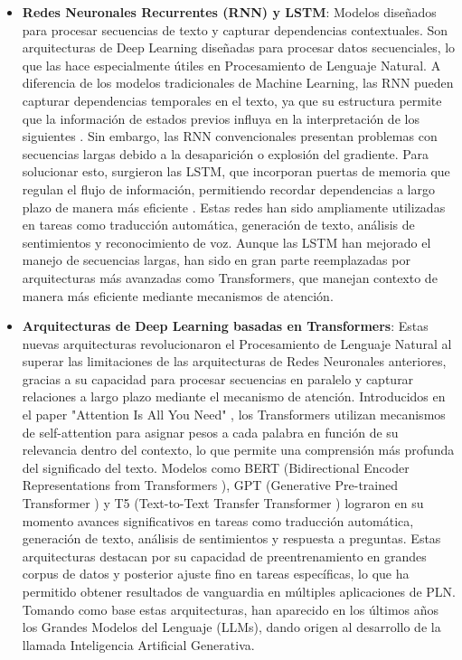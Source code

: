 \begin{itemize}
\begin{itemize}
            \item \textbf{Redes Neuronales Recurrentes (RNN) y LSTM}: Modelos diseñados para procesar secuencias de texto y capturar dependencias contextuales.
            Son arquitecturas de Deep Learning diseñadas para procesar datos secuenciales, lo que las hace especialmente útiles en Procesamiento de Lenguaje Natural. 
            A diferencia de los modelos tradicionales de Machine Learning, las RNN pueden capturar dependencias temporales en el texto, ya que su estructura permite que la información de estados previos influya en la interpretación de los siguientes \cite{schmidt2019recurrentneuralnetworksrnns}. 
            Sin embargo, las RNN convencionales presentan problemas con secuencias largas debido a la desaparición o explosión del gradiente. 
            Para solucionar esto, surgieron las LSTM, que incorporan puertas de memoria que regulan el flujo de información, permitiendo recordar dependencias a largo plazo de manera más eficiente \cite{staudemeyer2019understandinglstmtutorial}. 
            Estas redes han sido ampliamente utilizadas en tareas como traducción automática, generación de texto, análisis de sentimientos y reconocimiento de voz. 
            Aunque las LSTM han mejorado el manejo de secuencias largas, han sido en gran parte reemplazadas por arquitecturas más avanzadas como Transformers, que manejan contexto de manera más eficiente mediante mecanismos de atención.
            
            \item \textbf{Arquitecturas de Deep Learning basadas en Transformers}: Estas nuevas arquitecturas revolucionaron el Procesamiento de Lenguaje Natural al superar las limitaciones de las arquitecturas de Redes Neuronales anteriores, gracias a su capacidad para procesar secuencias en paralelo y capturar relaciones a largo plazo mediante el mecanismo de atención. 
            Introducidos en el paper "Attention Is All You Need" \cite{vaswani2023attentionneed}, los Transformers utilizan mecanismos de self-attention para asignar pesos a cada palabra en función de su relevancia dentro del contexto, lo que permite una comprensión más profunda del significado del texto. 
            Modelos como BERT (Bidirectional Encoder Representations from Transformers \cite{devlin2019bertpretrainingdeepbidirectional}), GPT (Generative Pre-trained Transformer \cite{yenduri2023generativepretrainedtransformercomprehensive}) y T5 (Text-to-Text Transfer Transformer \cite{raffel2023exploringlimitstransferlearning}) lograron en su momento avances significativos en tareas como traducción automática, generación de texto, análisis de sentimientos y respuesta a preguntas. 
            Estas arquitecturas destacan por su capacidad de preentrenamiento en grandes corpus de datos y posterior ajuste fino en tareas específicas, lo que ha permitido obtener resultados de vanguardia en múltiples aplicaciones de PLN. 
            Tomando como base estas arquitecturas, han aparecido en los últimos años los Grandes Modelos del Lenguaje (LLMs), dando origen al desarrollo de la llamada Inteligencia Artificial Generativa.
        \end{itemize}

\end{itemize}

